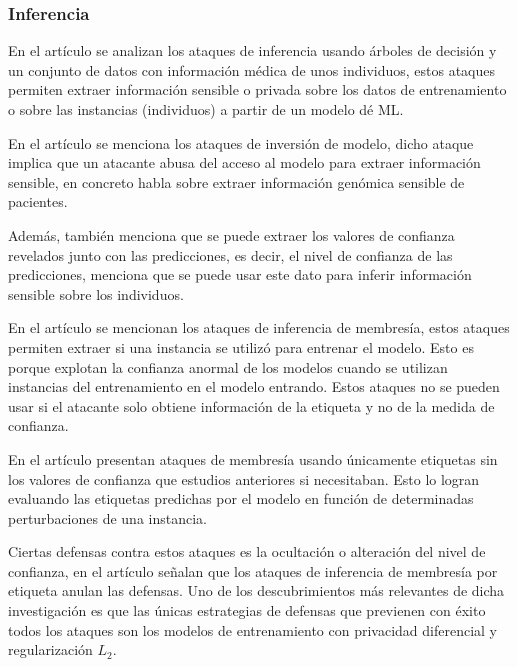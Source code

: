 
\subsubsection{Inferencia}

En el artículo \cite{10.1145/2810103.2813677} se analizan los ataques de inferencia usando árboles de decisión y un conjunto de datos con información médica de unos individuos, estos ataques permiten extraer información sensible o privada sobre los datos de entrenamiento o sobre las instancias (individuos) a partir de un modelo dé \gls{ML}.

En el artículo se menciona los ataques de inversión de modelo, dicho ataque implica que un atacante abusa del acceso al modelo para extraer información sensible, en concreto habla sobre extraer información genómica sensible de pacientes.

Además, también menciona que se puede extraer los valores de confianza revelados junto con las predicciones, es decir, el nivel de confianza de las predicciones, menciona que se puede usar este dato para inferir información sensible sobre los individuos.

En el artículo \cite{choquettechoo2021labelonly} se mencionan los ataques de inferencia de membresía, estos ataques permiten extraer si una instancia se utilizó para entrenar el modelo. Esto es porque explotan la confianza anormal de los modelos cuando se utilizan instancias del entrenamiento en el modelo entrando. Estos ataques no se pueden usar si el atacante solo obtiene información de la etiqueta y no de la medida de confianza.

En el artículo presentan ataques de membresía usando únicamente etiquetas sin los valores de confianza que estudios anteriores si necesitaban. Esto lo logran evaluando las etiquetas predichas por el modelo en función de determinadas perturbaciones de una instancia.

Ciertas defensas contra estos ataques es la ocultación o alteración del nivel de confianza, en el artículo señalan que los ataques de inferencia de membresía por etiqueta anulan las defensas. Uno de los descubrimientos más relevantes de dicha investigación es que las únicas estrategias de defensas que previenen con éxito todos los ataques son los modelos de entrenamiento con privacidad diferencial y regularización ${L_{2}}$.


